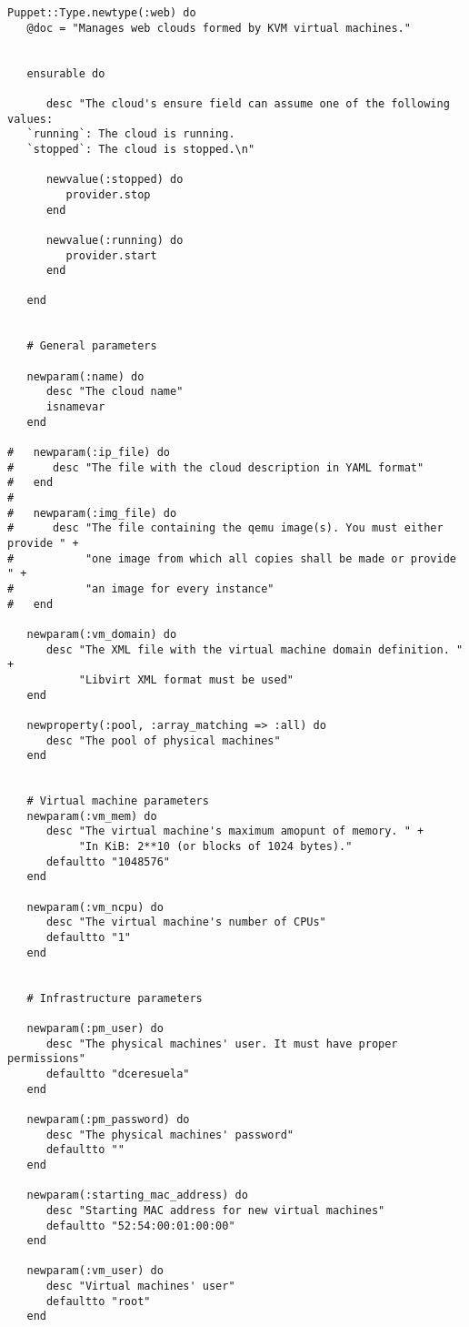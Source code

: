 \begin{lstlisting}
Puppet::Type.newtype(:web) do
   @doc = "Manages web clouds formed by KVM virtual machines."
   
   
   ensurable do

      desc "The cloud's ensure field can assume one of the following values:
   `running`: The cloud is running.
   `stopped`: The cloud is stopped.\n"
   
      newvalue(:stopped) do
         provider.stop
      end

      newvalue(:running) do
         provider.start
      end

   end


   # General parameters
   
   newparam(:name) do
      desc "The cloud name"
      isnamevar
   end
   
#   newparam(:ip_file) do
#      desc "The file with the cloud description in YAML format"
#   end
#   
#   newparam(:img_file) do
#      desc "The file containing the qemu image(s). You must either provide " +
#           "one image from which all copies shall be made or provide " +
#           "an image for every instance"
#   end
   
   newparam(:vm_domain) do
      desc "The XML file with the virtual machine domain definition. " +
           "Libvirt XML format must be used"
   end
   
   newproperty(:pool, :array_matching => :all) do
      desc "The pool of physical machines"
   end

   
   # Virtual machine parameters
   newparam(:vm_mem) do
      desc "The virtual machine's maximum amopunt of memory. " + 
           "In KiB: 2**10 (or blocks of 1024 bytes)."
      defaultto "1048576"
   end
   
   newparam(:vm_ncpu) do
      desc "The virtual machine's number of CPUs"
      defaultto "1"
   end
   
   
   # Infrastructure parameters

   newparam(:pm_user) do
      desc "The physical machines' user. It must have proper permissions"
      defaultto "dceresuela"
   end

   newparam(:pm_password) do
      desc "The physical machines' password"
      defaultto ""
   end

   newparam(:starting_mac_address) do
      desc "Starting MAC address for new virtual machines"
      defaultto "52:54:00:01:00:00"
   end

   newparam(:vm_user) do
      desc "Virtual machines' user"
      defaultto "root"
   end


\end{lstlisting}
